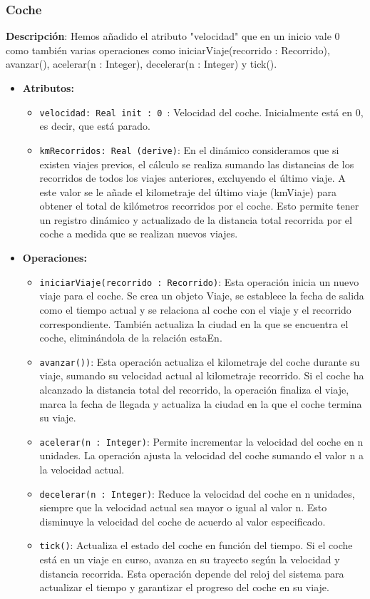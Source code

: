 \documentclass[12pt.a4paper]{article}
\begin{document}
\subsubsection{Coche}
\textbf{Descripción}:  Hemos añadido el atributo "velocidad" que en un inicio vale 0 como también varias operaciones como iniciarViaje(recorrido : Recorrido), avanzar(), acelerar(n : Integer), decelerar(n : Integer) y tick().
\begin{itemize}
    \item \textbf{Atributos:}
    \begin{itemize}
        \item \texttt{velocidad: Real init : 0 }: Velocidad del coche. Inicialmente está en 0, es decir, que está parado.
        \item \texttt{kmRecorridos: Real (derive)}: En el dinámico consideramos que si existen viajes previos, el cálculo se realiza sumando las distancias de los recorridos de todos los viajes anteriores, excluyendo el último viaje. A este valor se le añade el kilometraje del último viaje (kmViaje) para obtener el total de kilómetros recorridos por el coche. Esto permite tener un registro dinámico y actualizado de la distancia total recorrida por el coche a medida que se realizan nuevos viajes.
    \end{itemize}
    \item \textbf{Operaciones:}
    \begin{itemize}
        \item \texttt{iniciarViaje(recorrido : Recorrido)}: Esta operación inicia un nuevo viaje para el coche. Se crea un objeto Viaje, se establece la fecha de salida como el tiempo actual y se relaciona al coche con el viaje y el recorrido correspondiente. También actualiza la ciudad en la que se encuentra el coche, eliminándola de la relación estaEn.
        \item \texttt{avanzar())}: Esta operación actualiza el kilometraje del coche durante su viaje, sumando su velocidad actual al kilometraje recorrido. Si el coche ha alcanzado la distancia total del recorrido, la operación finaliza el viaje, marca la fecha de llegada y actualiza la ciudad en la que el coche termina su viaje.
        \item \texttt{acelerar(n : Integer)}: Permite incrementar la velocidad del coche en n unidades. La operación ajusta la velocidad del coche sumando el valor n a la velocidad actual.
        \item \texttt{decelerar(n : Integer)}: Reduce la velocidad del coche en n unidades, siempre que la velocidad actual sea mayor o igual al valor n. Esto disminuye la velocidad del coche de acuerdo al valor especificado.
        \item \texttt{tick()}: Actualiza el estado del coche en función del tiempo. Si el coche está en un viaje en curso, avanza en su trayecto según la velocidad y distancia recorrida. Esta operación depende del reloj del sistema para actualizar el tiempo y garantizar el progreso del coche en su viaje.
    \end{itemize}
\end{itemize}
\end{document}
